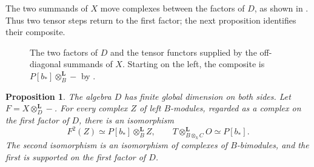 \documentclass[11pt]{article}
\numberwithin{equation}{section}
\newtheorem{proposition}[theorem]{Proposition}
\theoremstyle{definition}
\theoremstyle{remark}
\newcommand{\D}{\mathsf D}
\newcommand{\otL}{\otimes^{\mathbf L}}
\DeclareMathOperator{\modu}{mod}
\begin{document}
The two summands of \(X\) move complexes between the factors of \(D\),
as shown in . Thus two tensor steps return to the
first factor; the next proposition identifies their composite.

\begin{figure}[htbp]
\centering
{}
\caption{The two factors of \(D\) and the tensor functors supplied by
the off-diagonal summands of \(X\). Starting on the left, the composite
is \(P[b_*]\otL_B-\) by .}
\label{fig:simulation}
\end{figure}

\begin{proposition}
\label{prop:ordinary-simulation}
The algebra \(D\) has finite global dimension on both sides.
Let \(F=X\otL_D-\).  For every complex \(Z\) of left
\(B\)-modules, regarded as a complex on the first factor of
\(D\), there is an isomorphism
\begin{equation}
\label{eq:compression}
F^2(Z)\simeq P[b_*]\otL_B Z,
\qquad
T\otL_{B\otimes_k C}O\simeq P[b_*].
\end{equation}
The second isomorphism is an isomorphism of complexes of
\(B\)-bimodules, and the first is supported on the first
factor of \(D\).
\end{proposition}
\end{document}
